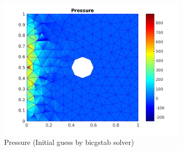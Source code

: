 \documentclass[a4paper]{book}
\begin{document}
\begin{figure}
\begin{subfigure}{\textwidth}
  \includegraphics[width=\linewidth]{cylinder_newton_pressure_bicgstab.jpg}
  \caption{Pressure (Initial guess by bicgstab solver)}
  \label{pressure_navier_stoke_bicgstab}
\end{subfigure}
\caption{\label{flow_over_cylinder_bicgstab_n_s}}
\end{figure}
\end{document}
